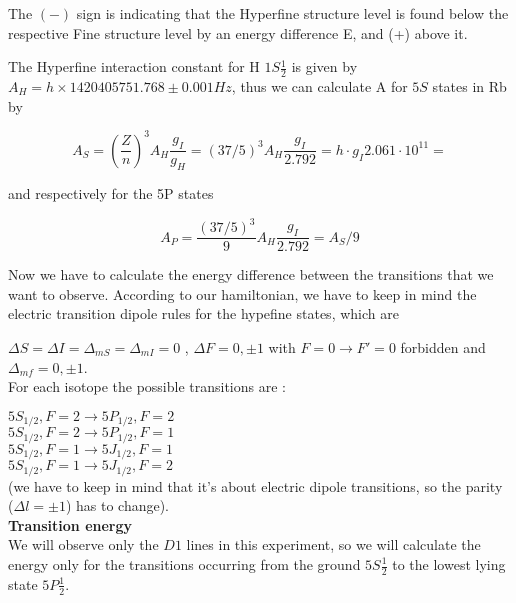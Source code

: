 \documentclass[openany,11pt,a4paper]{book}
\begin{document}
The $(-)$ sign is indicating that the Hyperfine structure level is found below the respective Fine structure level by an energy difference E, and (+) above it.


The Hyperfine interaction constant for H $1S\frac{1}{2}$ is given by $A_{H}= h \times 1420405751.768 \pm 0.001 Hz$, thus we can calculate A for $5S$ states in Rb by

\begin{equation}
A_{S} = (\dfrac{Z}{n})^{3} A_{H} \dfrac{g_{I}}{g_{H}} = (37/5)^{3} A_{H}\dfrac{g_{I}}{2.792}  = h \cdot g_{I} 2.061 \cdot 10^{11} =  
\end{equation}

and respectively for the 5P states 

\begin{equation}
A_{P} = \dfrac{(37/5)^{3}}{9} A_{H} \dfrac{g_{I}}{2.792} =  A_{S}/9
\end{equation}



Now we have to calculate the energy difference between the transitions that we want to observe.
According to our hamiltonian, we have to keep in mind the electric transition dipole rules for the hypefine states, which are 



$\Delta S = \Delta I = \Delta_{mS} = \Delta_{mI}= 0$ , $\Delta F = 0,\pm 1$  with $F = 0 \rightarrow F'=0$ forbidden and $\Delta _{mf}= 0, \pm 1$.\\

 

For each isotope the possible transitions are :

$5S_{1/2},F=2 \rightarrow 5P_{1/2}, F=2$ \\


$5S_{1/2}, F=2 \rightarrow 5P_{1/2}, F=1$\\


$5S_{1/2}, F=1 \rightarrow 5J_{1/2}, F=1$\\


$5S_{1/2}, F=1 \rightarrow 5J_{1/2}, F=2$\\

(we have to keep in mind that it's about electric dipole transitions, so the parity ($\Delta l = \pm 1$) has to change).\\


\textbf{Transition energy}\\

We will observe only the $D1$ lines in this experiment, so we will calculate the energy only for the transitions occurring from the ground $5S\frac{1}{2}$ to the lowest lying state $5P\frac{1}{2}$.\\\\
\end{document}
